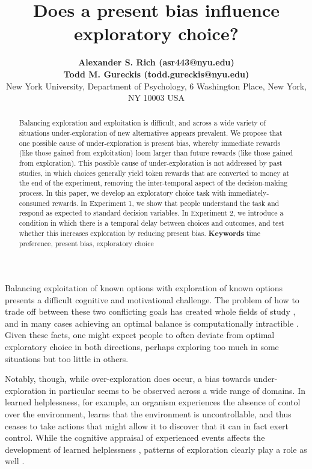 \documentclass[10pt,letterpaper]{article}
\title{Does a present bias influence exploratory choice?}
\author{  {\large \bf Alexander S. Rich (asr443@nyu.edu)} \\ {\large\bf Todd M. Gureckis (todd.gureckis@nyu.edu)}\\
        New York University, Department of Psychology, 6 Washington Place, New York, NY 10003 USA}
\begin{document}
\maketitle

\begin{abstract}

  Balancing exploration and exploitation is difficult, and across a wide
  variety of situations under-exploration of new alternatives appears prevalent.
  We propose that one possible cause of
  under-exploration is present bias, whereby immediate rewards (like those
  gained from exploitation) loom larger than future rewards (like those
  gained from exploration). This possible cause of under-exploration is not
  addressed by past studies, in which choices generally yield token rewards
  that are converted to money at the end of the experiment, removing the
  inter-temporal aspect of the decision-making process. In this paper, we
  develop an exploratory choice task with immediately-consumed rewards. In
  Experiment 1, we show that people understand the task and respond as expected
  to standard decision variables. In Experiment 2, we introduce a condition in
  which there is a temporal delay between choices and outcomes, and test whether
  this increases exploration by reducing present bias. 
  \textbf{Keywords} time preference, present bias, exploratory choice
\end{abstract}

Balancing exploitation of known options with exploration of known options
presents a difficult cognitive and motivational challenge. The problem of how to
trade off between these two conflicting goals has created whole fields of study
\citep{Mehlhorn2015, sutton1998reinforcement}, and in many cases achieving an
optimal balance is computationally intractible \citep{Guez2013}. Given these
facts, one might expect people to often deviate from optimal exploratory choice
in both directions, perhaps exploring too much in some situations but too little
in others.

Notably, though, while over-exploration does occur, a bias towards under-exploration in particular seems to be
observed across a wide range of domains. In learned helplessness, for example, an organism
experiences the absence of contol over the environment, learns that the
environment is uncontrollable, and thus ceases to take actions that might allow
it to discover that it can in fact exert control. %
While the cognitive appraisal of experienced events affects the development of
learned helplessness \citep{Abramson1978}, patterns of exploration clearly play
a role as well \citep{Huys2009, Teodorescu2014a}. %
\end{document}
